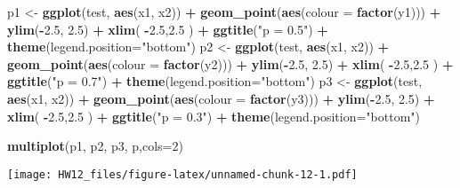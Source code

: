 \documentclass[]{article}
\newenvironment{Shaded}{\begin{snugshade}}{\end{snugshade}}
\newcommand{\KeywordTok}[1]{\textcolor[rgb]{0.13,0.29,0.53}{\textbf{#1}}}
\newcommand{\DataTypeTok}[1]{\textcolor[rgb]{0.13,0.29,0.53}{#1}}
\newcommand{\DecValTok}[1]{\textcolor[rgb]{0.00,0.00,0.81}{#1}}
\newcommand{\FloatTok}[1]{\textcolor[rgb]{0.00,0.00,0.81}{#1}}
\newcommand{\StringTok}[1]{\textcolor[rgb]{0.31,0.60,0.02}{#1}}
\newcommand{\OperatorTok}[1]{\textcolor[rgb]{0.81,0.36,0.00}{\textbf{#1}}}
\newcommand{\NormalTok}[1]{#1}
\begin{document}
\begin{Shaded}
\begin{Highlighting}[]
\NormalTok{p1 <-}\StringTok{ }\KeywordTok{ggplot}\NormalTok{(test, }\KeywordTok{aes}\NormalTok{(x1, x2)) }\OperatorTok{+}\StringTok{ }\KeywordTok{geom_point}\NormalTok{(}\KeywordTok{aes}\NormalTok{(}\DataTypeTok{colour =} \KeywordTok{factor}\NormalTok{(y1))) }\OperatorTok{+}
\StringTok{  }\KeywordTok{ylim}\NormalTok{(}\OperatorTok{-}\FloatTok{2.5}\NormalTok{, }\FloatTok{2.5}\NormalTok{) }\OperatorTok{+}\StringTok{ }\KeywordTok{xlim}\NormalTok{( }\OperatorTok{-}\FloatTok{2.5}\NormalTok{,}\FloatTok{2.5}\NormalTok{ ) }\OperatorTok{+}\StringTok{ }\KeywordTok{ggtitle}\NormalTok{(}\StringTok{"p = 0.5"}\NormalTok{) }\OperatorTok{+}
\StringTok{  }\KeywordTok{theme}\NormalTok{(}\DataTypeTok{legend.position=}\StringTok{"bottom"}\NormalTok{)}
\NormalTok{p2 <-}\StringTok{ }\KeywordTok{ggplot}\NormalTok{(test, }\KeywordTok{aes}\NormalTok{(x1, x2)) }\OperatorTok{+}\StringTok{ }\KeywordTok{geom_point}\NormalTok{(}\KeywordTok{aes}\NormalTok{(}\DataTypeTok{colour =} \KeywordTok{factor}\NormalTok{(y2))) }\OperatorTok{+}
\StringTok{  }\KeywordTok{ylim}\NormalTok{(}\OperatorTok{-}\FloatTok{2.5}\NormalTok{, }\FloatTok{2.5}\NormalTok{) }\OperatorTok{+}\StringTok{ }\KeywordTok{xlim}\NormalTok{( }\OperatorTok{-}\FloatTok{2.5}\NormalTok{,}\FloatTok{2.5}\NormalTok{ ) }\OperatorTok{+}\StringTok{ }\KeywordTok{ggtitle}\NormalTok{(}\StringTok{"p = 0.7"}\NormalTok{) }\OperatorTok{+}
\StringTok{  }\KeywordTok{theme}\NormalTok{(}\DataTypeTok{legend.position=}\StringTok{"bottom"}\NormalTok{)}
\NormalTok{p3 <-}\StringTok{ }\KeywordTok{ggplot}\NormalTok{(test, }\KeywordTok{aes}\NormalTok{(x1, x2)) }\OperatorTok{+}\StringTok{ }\KeywordTok{geom_point}\NormalTok{(}\KeywordTok{aes}\NormalTok{(}\DataTypeTok{colour =} \KeywordTok{factor}\NormalTok{(y3))) }\OperatorTok{+}
\StringTok{  }\KeywordTok{ylim}\NormalTok{(}\OperatorTok{-}\FloatTok{2.5}\NormalTok{, }\FloatTok{2.5}\NormalTok{) }\OperatorTok{+}\StringTok{ }\KeywordTok{xlim}\NormalTok{( }\OperatorTok{-}\FloatTok{2.5}\NormalTok{,}\FloatTok{2.5}\NormalTok{ ) }\OperatorTok{+}\StringTok{ }\KeywordTok{ggtitle}\NormalTok{(}\StringTok{"p = 0.3"}\NormalTok{) }\OperatorTok{+}
\StringTok{  }\KeywordTok{theme}\NormalTok{(}\DataTypeTok{legend.position=}\StringTok{"bottom"}\NormalTok{)}

\KeywordTok{multiplot}\NormalTok{(p1, p2, p3,  p,}\DataTypeTok{cols=}\DecValTok{2}\NormalTok{)}
\end{Highlighting}
\end{Shaded}

\texttt{[image: HW12\_files/figure-latex/unnamed-chunk-12-1.pdf]}
\end{document}
